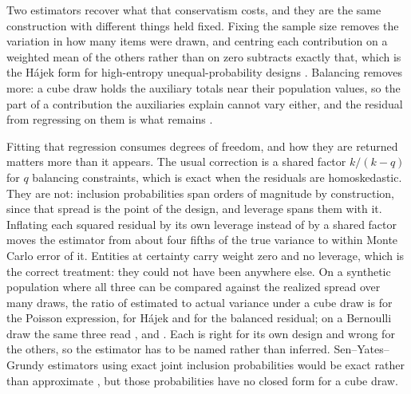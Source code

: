\documentclass[11pt]{article}
\theoremstyle{plain}
\theoremstyle{remark}
\begin{document}
Two estimators recover what that conservatism costs, and they are the same construction with different things held fixed. Fixing the sample size removes the variation in how many items were drawn, and centring each contribution on a weighted mean of the others rather than on zero subtracts exactly that, which is the H\'ajek form for high-entropy unequal-probability designs \citep{Hajek1964}. Balancing removes more: a cube draw holds the auxiliary totals near their population values, so the part of a contribution the auxiliaries explain cannot vary either, and the residual from regressing on them is what remains \citep{DevilleTille2005}.

Fitting that regression consumes degrees of freedom, and how they are returned matters more than it appears. The usual correction is a shared factor $k/(k-q)$ for $q$ balancing constraints, which is exact when the residuals are homoskedastic. They are not: inclusion probabilities span orders of magnitude by construction, since that spread is the point of the design, and leverage spans them with it. Inflating each squared residual by its own leverage instead of by a shared factor moves the estimator from about four fifths of the true variance to within Monte Carlo error of it. Entities at certainty carry weight zero and no leverage, which is the correct treatment: they could not have been anywhere else. On a synthetic population where all three can be compared against the realized spread over many draws, the ratio of estimated to actual variance under a cube draw is \VarCubePoisson{} for the Poisson expression, \VarCubeHajek{} for H\'ajek and \VarCubeBalanced{} for the balanced residual; on a Bernoulli draw the same three read \VarPoissonPoisson{}, \VarPoissonHajek{} and \VarPoissonBalanced{}. Each is right for its own design and wrong for the others, so the estimator has to be named rather than inferred. Sen--Yates--Grundy estimators using exact joint inclusion probabilities would be exact rather than approximate \citep{Sen1953,YatesGrundy1953}, but those probabilities have no closed form for a cube draw.
\end{document}
